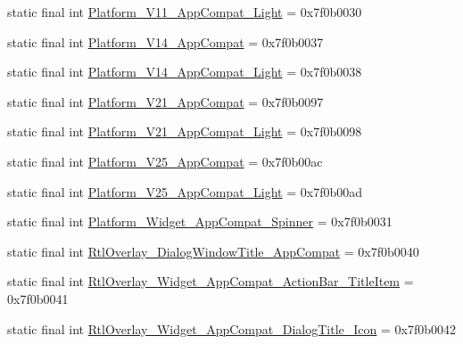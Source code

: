 \begin{CompactItemize}
\item 
static final int \hyperlink{classandroid_1_1support_1_1graphics_1_1drawable_1_1animated_1_1_r_1_1style_9a28a9e377335afc1a9d40623cd71001}{Platform\_\-V11\_\-AppCompat\_\-Light} = 0x7f0b0030
\item 
static final int \hyperlink{classandroid_1_1support_1_1graphics_1_1drawable_1_1animated_1_1_r_1_1style_2e081c38bef5bc68be19b55d34a08ec3}{Platform\_\-V14\_\-AppCompat} = 0x7f0b0037
\item 
static final int \hyperlink{classandroid_1_1support_1_1graphics_1_1drawable_1_1animated_1_1_r_1_1style_25b0f8c690c8563b861cf7c872ea316c}{Platform\_\-V14\_\-AppCompat\_\-Light} = 0x7f0b0038
\item 
static final int \hyperlink{classandroid_1_1support_1_1graphics_1_1drawable_1_1animated_1_1_r_1_1style_129a8ead827fec701ded9448b6be05f6}{Platform\_\-V21\_\-AppCompat} = 0x7f0b0097
\item 
static final int \hyperlink{classandroid_1_1support_1_1graphics_1_1drawable_1_1animated_1_1_r_1_1style_b8735f689806505476a91ed64e5f2532}{Platform\_\-V21\_\-AppCompat\_\-Light} = 0x7f0b0098
\item 
static final int \hyperlink{classandroid_1_1support_1_1graphics_1_1drawable_1_1animated_1_1_r_1_1style_cba9de89ee242caec1b7e851f962a42d}{Platform\_\-V25\_\-AppCompat} = 0x7f0b00ac
\item 
static final int \hyperlink{classandroid_1_1support_1_1graphics_1_1drawable_1_1animated_1_1_r_1_1style_e3768cb7e3de2904c5b81e5a6352ef1d}{Platform\_\-V25\_\-AppCompat\_\-Light} = 0x7f0b00ad
\item 
static final int \hyperlink{classandroid_1_1support_1_1graphics_1_1drawable_1_1animated_1_1_r_1_1style_770ccbfe86ed16cf5e6e926846992671}{Platform\_\-Widget\_\-AppCompat\_\-Spinner} = 0x7f0b0031
\item 
static final int \hyperlink{classandroid_1_1support_1_1graphics_1_1drawable_1_1animated_1_1_r_1_1style_1c129b402c694e178e464091eb5677cc}{RtlOverlay\_\-DialogWindowTitle\_\-AppCompat} = 0x7f0b0040
\item 
static final int \hyperlink{classandroid_1_1support_1_1graphics_1_1drawable_1_1animated_1_1_r_1_1style_d4a8344cafdd1e64dc24b8a0291de6df}{RtlOverlay\_\-Widget\_\-AppCompat\_\-ActionBar\_\-TitleItem} = 0x7f0b0041
\item 
static final int \hyperlink{classandroid_1_1support_1_1graphics_1_1drawable_1_1animated_1_1_r_1_1style_439584cb63d1c769f0a92a468ecc514a}{RtlOverlay\_\-Widget\_\-AppCompat\_\-DialogTitle\_\-Icon} = 0x7f0b0042

\end{CompactItemize}
